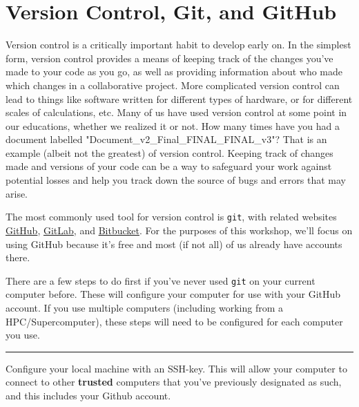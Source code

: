 
\section{Version Control, Git, and GitHub}
Version control is a critically important habit to develop early on.
In the simplest form, version control provides a means of keeping track of the changes you've made to your code as you go, as well as providing information about who made which changes in a collaborative project.
More complicated version control can lead to things like software written for different types of hardware, or for different scales of calculations, etc.
Many of us have used version control at some point in our educations, whether we realized it or not.
How many times have you had a document labelled "Document_v2_Final_FINAL_FINAL_v3"?
That is an example (albeit not the greatest) of version control.
Keeping track of changes made and versions of your code can be a way to safeguard your work against potential losses and help you track down the source of bugs and errors that may arise.


The most commonly used tool for version control is \texttt{git}, with
related websites \href{https://www.github.com}{GitHub},
\href{https://about.gitlab.com/}{GitLab}, and
\href{https://bitbucket.org/}{Bitbucket}. For the purposes of this
workshop, we'll focus on using GitHub because it's free and most (if not
all) of us already have accounts there.

There are a few steps to do first if you've never used \texttt{git} on
your current computer before. These will configure your computer for use
with your GitHub account. If you use multiple computers (including
working from a HPC/Supercomputer), these steps will need to be
configured for each computer you use.

\begin{center}\rule{0.5\linewidth}{0.5pt}\end{center}

Configure your local machine with an SSH-key. This will allow your
computer to connect to other \textbf{trusted} computers that you've
previously designated as such, and this includes your Github account.

\begin{Shaded}
\begin{Highlighting}[]
     
\end{Highlighting}
\end{Shaded}

